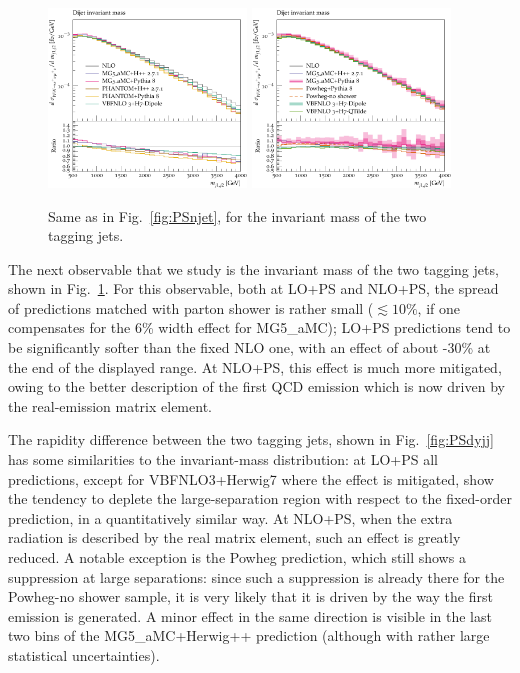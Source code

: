 \begin{figure}[hbt]
\centering
\includegraphics[width=0.47\textwidth]{figures/LOPS/m_jj.pdf}
\includegraphics[width=0.47\textwidth]{figures/NLOPS/m_jj.pdf}
\caption{Same as in Fig.~\protect\ref{fig:PSnjet}, for the invariant mass of the two tagging jets.}
\label{fig:PSmjj}
\end{figure}

The next observable that we study is the invariant mass of the two tagging jets, shown in Fig.~\ref{fig:PSmjj}. For this observable, both at LO+PS and NLO+PS,
the spread of predictions matched with parton shower is rather small
($\lesssim 10\%$, if one compensates for the 6\% width effect for {\sc MG5\_aMC}); LO+PS predictions tend to be significantly softer than the fixed NLO one, with an effect of
about -30\% at the end of the displayed range. At NLO+PS, this effect is much more mitigated, owing to the better description of the first QCD emission which is now driven by the real-emission matrix element.
 
The rapidity difference between the two tagging jets, shown in Fig.~\ref{fig:PSdyjj} has some similarities to the invariant-mass distribution: at LO+PS all predictions,
except for {\sc VBFNLO3+Herwig7} where the effect is mitigated, show the tendency to deplete the large-separation region with respect to the fixed-order prediction, in a
quantitatively similar way. At NLO+PS, when the extra radiation is described by the real matrix element, such an effect is greatly reduced. A notable
exception is the {\sc Powheg} prediction, which still shows a suppression at large separations: since such a suppression is already there for the {\sc Powheg-no shower} sample,
it is very likely that it is driven by the way the first emission is generated. A minor effect in the same direction is visible in the last two bins of the
{\sc MG5\_aMC+Herwig++} prediction (although with rather large statistical uncertainties).




